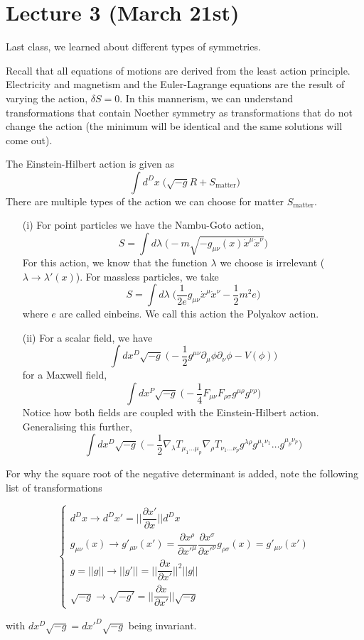 \section{Lecture 3 (March 21st)}
Last class, we learned about different types of symmetries. 
\\
\begin{recall}
Recall that all equations of motions are derived from the least action principle. Electricity and magnetism and the Euler-Lagrange equations are the result of varying the action, $\delta S=0$. In this mannerism, we can understand transformations that contain Noether symmetry as transformations that do not change the action (the minimum will be identical and the same solutions will come out).
\end{recall}
\vspace{2ex}
\begin{defi}
The Einstein-Hilbert action is given as
\[\int d^{D}x\;\Big(\sqrt{-g}R+S_{\mathrm{matter}}\Big)\]
There are multiple types of the action we can choose for matter $S_{\mathrm{matter}}$.
\begin{itemize}
	\item[(i)] For point particles we have the Nambu-Goto action,
	\[S=\int d\lambda \;\Big(-m\sqrt{-g_{\mu \nu }(x)\dot{x}^{\mu }\dot{x}^{\nu }}\Big)\]
For this action, we know that the function $\lambda $ we choose is irrelevant ($\lambda \rightarrow \lambda '(x)$). For massless particles, we take
\[S=\int d\lambda \;\Big(\dfrac{1}{2e}g_{\mu \nu }\dot{x}^{\mu }\dot{x}^{\nu }-\dfrac{1}{2}m^2e\Big)\]
where $e$ are called einbeins. We call this action the Polyakov action. 
\item[(ii)] For a scalar field, we have
	\[\int dx^{D}\sqrt{-g}\;\Big(-\dfrac{1}{2}g^{\mu \nu }\partial _{\mu }\phi \partial _{\nu }\phi -V(\phi )\Big)\]
for a Maxwell field,
\[\int dx^{P}\sqrt{-g}\;\Big(-\dfrac{1}{4}F_{\mu \nu }F_{\rho \sigma }g^{\mu \rho }g^{\nu \rho }\Big)\]
Notice how both fields are coupled with the Einstein-Hilbert action. Generalising this further,
\[\int dx^{D}\sqrt{-g}\;\Big(-\dfrac{1}{2}\nabla _{\lambda }T_{\mu_1\ldots \mu_{p}}\nabla _{\rho }T_{\nu_1\ldots \nu_{p}}g^{\lambda \rho }g^{\mu_1\nu_1}\ldots g^{\mu _{p}\nu _{p}}\Big)\]
\end{itemize}
For why the square root of the negative determinant is added, note the following list of transformations
\begin{spacing}{2}
\[\begin{cases}
d^{D}x\rightarrow d^{D}x'=||\dfrac{\partial x'}{\partial x}||d^{D}x\\
g_{\mu \nu }(x)\rightarrow g'_{\mu \nu }(x')=\dfrac{\partial x^{\rho }}{\partial x'^{\mu }}\dfrac{\partial x^{\sigma }}{\partial x'^{\nu }}g_{\rho \sigma }(x)=g'_{\mu \nu }(x')\\
g=||g||\rightarrow ||g'||=||\dfrac{\partial x}{\partial x'}||^2||g||\\
\sqrt{-g}\rightarrow \sqrt{-g'}=||\dfrac{\partial x}{\partial x'}||\sqrt{-g} 
\end{cases}\]
\end{spacing}
with $dx^{D}\sqrt{-g}=dx'^{D}\sqrt{-g}$ being invariant.
\end{defi}
